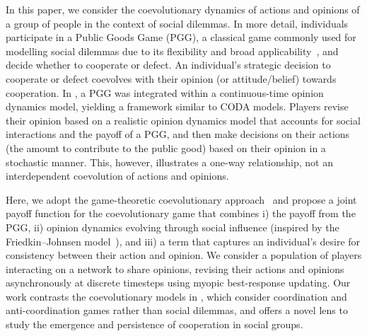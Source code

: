 \documentclass[letterpaper, 10 pt, conference]{ieeeconf}  %
\begin{document}
In this paper, we consider the coevolutionary dynamics of actions and opinions of a group of people in the context of social dilemmas. 
In more detail, individuals participate in a Public Goods Game (PGG), a classical game commonly used for modelling social dilemmas due to its flexibility and broad applicability~\cite{Bramoull2007}, and decide whether to cooperate or defect. An individual's strategic decision to cooperate or defect coevolves with their opinion (or attitude/belief) towards cooperation. In \cite{park_opinions_2021}, a PGG was integrated within a continuous-time opinion dynamics model, yielding a framework similar to CODA models. Players revise their opinion based on a realistic opinion dynamics model that accounts for social interactions and the payoff of a PGG, and then make decisions on their actions (the amount to contribute to the public good) based on their opinion in a stochastic manner. This, however, illustrates a one-way relationship, not an interdependent coevolution of actions and opinions.



Here, we adopt the game-theoretic coevolutionary approach~\cite{aghbolagh_coevolutionary_2023} and propose a joint payoff function for the coevolutionary game that combines i) the payoff from the PGG, ii) opinion dynamics evolving through social influence (inspired by the Friedkin--Johnsen model~\cite{friedkin_social_1990}), and iii) a term that captures an individual's desire for consistency between their action and opinion. We consider a population of players interacting on a network to share opinions, revising their actions and opinions asynchronously at discrete timesteps using myopic best-response updating. Our work contrasts the coevolutionary models in \cite{aghbolagh_coevolutionary_2023,liang_coevolution_2025}, which consider coordination and anti-coordination games rather than social dilemmas, and offers a novel lens to study the emergence and persistence of cooperation in social groups.
\end{document}
